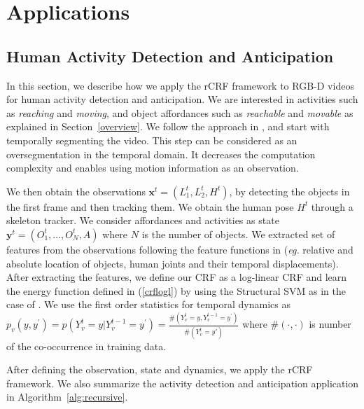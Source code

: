 \section{Applications}
\subsection{Human Activity Detection and Anticipation}
\label{rgbd}
In this section, we describe how we apply the rCRF framework to RGB-D videos for human activity detection and anticipation. We are interested in activities such as \emph{reaching} and \emph{moving}, and object affordances such as \emph{reachable} and \emph{movable} as explained in Section~\ref{overview}. We follow the approach in \cite{hemaIJRR}, and start with temporally segmenting the video. This step can be considered as an oversegmentation in the temporal domain. It decreases the computation complexity and enables using motion information as an observation.

We then obtain the observations $\mathbf{x}^t=(L_1^t,L_2^t,H^t)$, by detecting the objects in the first frame and then tracking them. We obtain the human pose $H^t$ through a skeleton tracker. We consider affordances and activities as state \mbox{$\mathbf{y}^t=(O^t_1,\ldots,O^t_N,A)$} where $N$ is the number of objects. We extracted set of features from the observations following the feature functions in \cite{hemaIJRR} (\emph{eg.} relative and absolute location of objects, human joints and their temporal displacements). After extracting the features, we define our CRF as a log-linear CRF and learn the energy function defined in (\ref{crflogl}) by using the Structural SVM \cite{ssvm} as in the case of \cite{hemaIJRR}. We use the first order statistics for temporal dynamics as \mbox{$p_v(y,y^\prime)=p(Y^t_v=y|Y^{t-1}_v=y^\prime)=\frac{\#(Y^t_v=y,Y^{t-1}_v=y^\prime)}{\#(Y^t_v=y\prime)}$} where $\#(\cdot,\cdot)$ is number of the co-occurrence in training data.

After defining the observation, state and dynamics, we apply the rCRF framework. We also summarize the activity detection and anticipation application in Algorithm~\ref{alg:recursive}.

